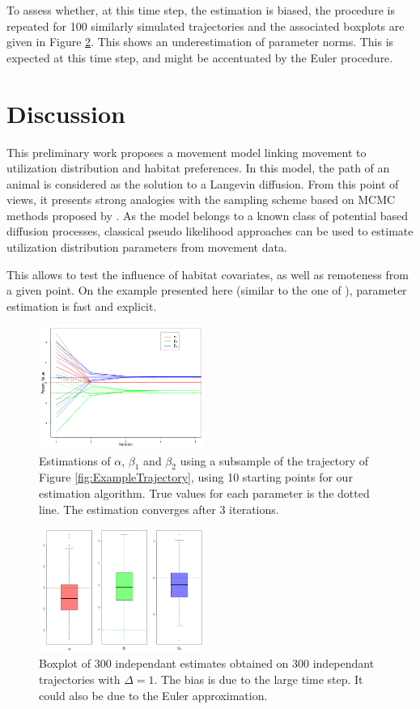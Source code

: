 \documentclass[10pt,a4paper]{article}
\begin{document}
To assess whether, at this time step, the estimation is biased, the procedure is repeated for 100 similarly simulated trajectories and the associated boxplots are given in Figure \ref{fig:BoxplotParams}. This shows an underestimation of parameter norms. This is expected at this time step, and might be accentuated by the Euler procedure.

\section{Discussion}

This preliminary work proposes a movement model linking movement to utilization distribution and habitat preferences. In this model, the path of an animal is considered as the solution to a Langevin diffusion. From this point of views, it presents strong analogies with the sampling scheme  based on MCMC methods proposed by \cite{michelot2017linking}. As the model belongs to a known class of potential based diffusion processes, classical pseudo likelihood approaches can be used to estimate utilization distribution parameters from movement data. 

This allows to test the influence of habitat covariates, as well as remoteness from a given point. On the example presented here (similar to the one of \citealp{michelot2017linking}), parameter estimation is fast and explicit.

\begin{figure}
\centering
\includegraphics[width = 0.48\textwidth]{figures/ParamEstimation}
\caption{\label{fig:ParamsEstimation} Estimations of $\alpha$, $\beta_1$ and $\beta_2$ using a subsample of the trajectory of Figure \ref{fig:ExampleTrajectory}, using 10 starting points for our estimation algorithm. True values for each parameter is the dotted line. The estimation converges after 3 iterations.}
\end{figure}
\begin{figure}
\centering
\includegraphics[width = 0.48\textwidth]{figures/BoxplotParams}
\caption{\label{fig:BoxplotParams} Boxplot of 300 independant estimates obtained on 300 independant trajectories with $\Delta = 1$. The bias is due to the large time step. It could also be due to the Euler approximation.}
\end{figure}


\end{document}
